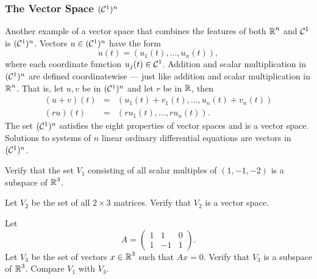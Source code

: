 \documentclass{ximera}
\begin{document}
\subsubsection*{The Vector Space $({\cal C}^1)^n$}

Another example of a vector space that combines the features of
both $\mbox{$\Bbb{R}$}^n$ and ${\cal C}^1$ is $({\cal C}^1)^n$.  Vectors
$u\in ({\cal C}^1)^n$ have the form
\[
u(t) = (u_1(t),\ldots,u_n(t)),
\]
where each coordinate function $u_j(t)\in{\cal C}^1$.  Addition and
scalar multiplication in $({\cal C}^1)^n$ are defined coordinatewise
--- just like addition and scalar multiplication in $\mbox{$\Bbb{R}$}^n$.
That is, let $u,v$ be in $({\cal C}^1)^n$ and let $r$ be in $\mbox{$\Bbb{R}$}$, then
\begin{eqnarray*}
(u+v)(t) & = & (u_1(t)+v_1(t),\ldots,u_n(t)+v_n(t)) \\
(ru)(t) & = & (ru_1(t),\ldots,ru_n(t)).
\end{eqnarray*}
The set $({\cal C}^1)^n$ satisfies the eight properties of vector spaces and
is a vector space.  Solutions to systems of $n$ linear ordinary differential
equations are vectors in $({\cal C}^1)^n$.


\EXER

\TEXER

\begin{exercise} \label{c5.1.1}
Verify that the set $V_1$ consisting of all scalar multiples of
$(1,-1,-2)$ is a subspace of $\mbox{$\Bbb{R}$}^3$.
\end{exercise}

\begin{exercise} \label{c5.1.2}
Let $V_2$ be the set of all $2\times 3$ matrices.   Verify that
$V_2$ is a vector space.
\end{exercise}

\begin{exercise} \label{c5.1.3}
Let
\[
A=\left(\begin{array}{rrr} 1 & 1 & 0\\ 1 & -1 & 1 \end{array}
\right).
\]
Let $V_3$ be the set of vectors $x\in\mbox{$\Bbb{R}$}^3$ such that $Ax=0$.
Verify that $V_3$ is a subspace of $\mbox{$\Bbb{R}$}^3$.  Compare $V_1$ with
$V_3$.
\end{exercise}
\end{document}

